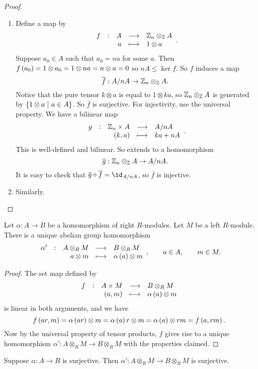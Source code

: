 \begin{proof}
\hfill
\begin{enumerate}
\item Define a map by
$$ \function[f]{A}{\ZZ_n \otimes_\ZZ A}{a}{1 \otimes a}. $$
Suppose $ a_0 \in A $ such that $ a_0 = na $ for some $ a $. Then $ f\br{a_0} = 1 \otimes a_0 = 1 \otimes na = n \otimes a = 0 $ so $ nA \le \ker f $. So $ f $ induces a map
$$ \overline{f} : A / nA \to \mathbb{Z}_n \otimes_{\mathbb{Z}} A. $$
Notice that the pure tensor $ k \otimes a $ is equal to $ 1 \otimes ka $, so $ \mathbb{Z}_n \otimes_{\mathbb{Z}} A $ is generated by $ \cbr{1 \otimes a \st a \in A} $. So $ \overline{f} $ is surjective. For injectivity, use the universal property. We have a bilinear map
$$ \function[g]{\ZZ_n \times A}{A / nA}{\br{k, a}}{ka + nA}. $$
This is well-defined and bilinear. So extends to a homomorphism
$$ \overline{g} : \mathbb{Z}_n \otimes_{\mathbb{Z}} A \to A / nA. $$
It is easy to check that $ \overline{g} \circ \overline{f} = \id_{A / nA} $, so $ \overline{f} $ is injective.
\item Similarly.
\end{enumerate}
\end{proof}

\pagebreak


\begin{proposition}
Let $ \alpha : A \to B $ be a homomorphism of right $ R $-modules. Let $ M $ be a left $ R $-module. There is a unique abelian group homomorphism
$$ \function[\alpha']{A \otimes_R M}{B \otimes_R M}{a \otimes m}{\alpha\br{a} \otimes m}, \qquad a \in A, \qquad m \in M. $$
\end{proposition}

\begin{proof}
The set map defined by
$$ \function[f]{A \times M}{B \otimes_R M}{\br{a, m}}{\alpha\br{a} \otimes m} $$
is linear in both arguments, and we have
$$ f\br{ar, m} = \alpha\br{ar} \otimes m = \alpha\br{a}r \otimes m = \alpha\br{a} \otimes rm = f\br{a, rm}. $$
Now by the universal property of tensor products, $ f $ gives rise to a unique homomorphism $ \alpha' : A \otimes_R M \to B \otimes_R M $ with the properties claimed.
\end{proof}

\begin{proposition}
Suppose $ \alpha : A \to B $ is surjective. Then $ \alpha' : A \otimes_R M \to B \otimes_R M $ is surjective.
\end{proposition}


